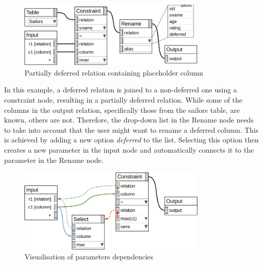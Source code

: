 \documentclass[11pt,a4paper]{globis-book}
\begin{document}
\begin{figure}[h]
  \centering
  \includegraphics[width=0.8\textwidth]{resources/PartDef.pdf}
  \caption{Partially deferred relation containing placeholder column}
  \label{fig:part_def}
\end{figure}

In this example, a deferred relation is joined to a non-deferred one using a constraint node, resulting in a partially deferred relation. While some of the columns in the output relation, specifically those from the sailors table, are known, others are not. Therefore, the drop-down list in the Rename node needs to take into account that the user might want to rename a deferred column. This is achieved by adding a new option \textit{deferred} to the list. Selecting this option then creates a new parameter in the input node and automatically connects it to the parameter in the Rename node.

\begin{figure}[h]
  \centering
  \includegraphics[width=0.8\textwidth]{resources/Dependencies.pdf}
  \caption{Visualisation of parameters dependencies}
  \label{fig:dependencies}
\end{figure}
\end{document}
